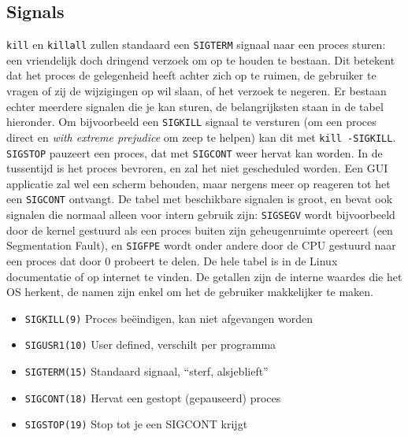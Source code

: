\subsection{Signals}\label{signals}

\texttt{kill} en \texttt{killall} zullen standaard een \texttt{SIGTERM} signaal naar een proces sturen: een vriendelijk doch dringend verzoek om op te houden te bestaan. Dit betekent dat het proces de gelegenheid heeft achter zich op te ruimen, de gebruiker te vragen of zij de wijzigingen op wil slaan, of het verzoek te negeren. Er bestaan echter meerdere signalen die je kan sturen, de belangrijksten staan in de tabel hieronder. Om bijvoorbeeld een \texttt{SIGKILL} signaal te versturen (om een proces direct en \emph{with extreme prejudice} om zeep te helpen) kan dit met \texttt{kill\ -SIGKILL}. \texttt{SIGSTOP} pauzeert een proces, dat met \texttt{SIGCONT} weer hervat kan worden. In de tussentijd is het proces bevroren, en zal het niet gescheduled worden. Een GUI applicatie zal wel een scherm behouden, maar nergens meer op reageren tot het een \texttt{SIGCONT} ontvangt. De tabel met beschikbare signalen is groot, en bevat ook signalen die normaal alleen voor intern gebruik zijn: \texttt{SIGSEGV} wordt bijvoorbeeld door de kernel gestuurd als een proces buiten zijn geheugenruimte opereert (een Segmentation Fault), en \texttt{SIGFPE} wordt onder andere door de CPU gestuurd naar een proces dat door 0 probeert te delen. De hele tabel is in de Linux documentatie of op internet te vinden. De getallen zijn de interne waardes die het OS herkent, de namen zijn enkel om het de gebruiker makkelijker te maken.

\begin{itemize}
  \item \texttt{SIGKILL(9)} Proces beëindigen, kan niet afgevangen worden \\
  \item \texttt{SIGUSR1(10)} User defined, verschilt per programma \\
  \item \texttt{SIGTERM(15)} Standaard signaal, ``sterf, alsjeblieft'' \\
  \item \texttt{SIGCONT(18)} Hervat een gestopt (gepauseerd) proces \\
  \item \texttt{SIGSTOP(19)} Stop tot je een SIGCONT krijgt \\
\end{itemize}

